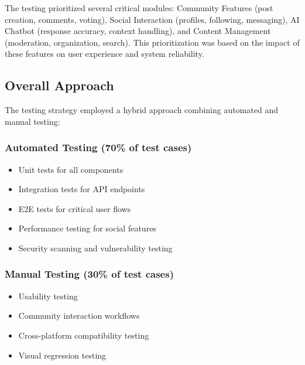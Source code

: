 The testing prioritized several critical modules: Community Features (post creation, comments, voting), Social Interaction (profiles, following, messaging), AI Chatbot (response accuracy, context handling), and Content Management (moderation, organization, search). This prioritization was based on the impact of these features on user experience and system reliability.

\subsection{Overall Approach}
The testing strategy employed a hybrid approach combining automated and manual testing:

\subsubsection{Automated Testing (70\% of test cases)}
\begin{itemize}
    \item Unit tests for all components
    \item Integration tests for API endpoints
    \item E2E tests for critical user flows
    \item Performance testing for social features
    \item Security scanning and vulnerability testing
\end{itemize}

\subsubsection{Manual Testing (30\% of test cases)}
\begin{itemize}
    \item Usability testing
    \item Community interaction workflows
    \item Cross-platform compatibility testing
    \item Visual regression testing
\end{itemize}

